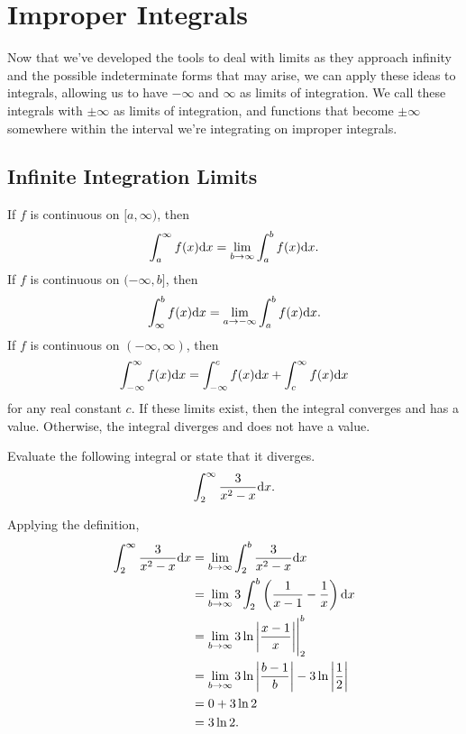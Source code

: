 \section{Improper Integrals}
Now that we've developed the tools to deal with limits as they approach infinity and the possible indeterminate forms that may arise, we can apply these ideas to integrals, allowing us to have $-\infty$ and $\infty$ as limits of integration.
We call these integrals with $\pm\infty$ as limits of integration, and functions that become $\pm\infty$ somewhere within the interval we're integrating on improper integrals.

\subsection{Infinite Integration Limits}
\begin{definition}
	If $f$ is continuous on $[a,\infty)$, then
	\begin{equation*}
		\int_{a}^{\infty}{f(x)\mathrm{d} x} = \lim_{b\to\infty}{\int_{a}^{b}{f(x)\mathrm{d} x}}.
	\end{equation*}
	If $f$ is continuous on $(-\infty,b]$, then
	\begin{equation*}
		\int_{\infty}^{b}{f(x)\mathrm{d} x} = \lim_{a\to-\infty}{\int_{a}^{b}{f(x)\mathrm{d} x}}.
	\end{equation*}
	If $f$ is continuous on $(-\infty,\infty)$, then
	\begin{equation*}
		\int_{-\infty}^{\infty}{f(x)\mathrm{d} x} = \int_{-\infty}^{c}{f(x)\mathrm{d} x} + \int_{c}^{\infty}{f(x)\mathrm{d} x}
	\end{equation*}
	for any real constant $c$.
	If these limits exist, then the integral converges and has a value.
	Otherwise, the integral diverges and does not have a value.
\end{definition}

\begin{example}
	Evaluate the following integral or state that it diverges.
	\begin{equation*}
		\int_{2}^{\infty}{\frac{3}{x^2-x}\mathrm{d} x}.
	\end{equation*}
\end{example}
Applying the definition,
\begin{align*}
	\int_{2}^{\infty}{\frac{3}{x^2-x}\mathrm{d} x} &= \lim_{b\to\infty}{\int_{2}^{b}{\frac{3}{x^2-x}\mathrm{d} x}} \\
	&= \lim_{b\to\infty}{3\int_{2}^{b}{\left(\frac{1}{x-1}-\frac{1}{x}\right)\mathrm{d} x}} \\
	&= \lim_{b\to\infty}{3\ln{\bigg\lvert\frac{x-1}{x}\bigg\rvert}\Biggr\rvert_{2}^{b}} \\
	&= \lim_{b\to\infty}{3\ln{\bigg\lvert\frac{b-1}{b}\bigg\rvert}} - 3\ln{\bigg\lvert\frac{1}{2}\bigg\rvert} \\
	&= 0 + 3\ln{2} \\
	&= 3\ln{2}.
\end{align*}

